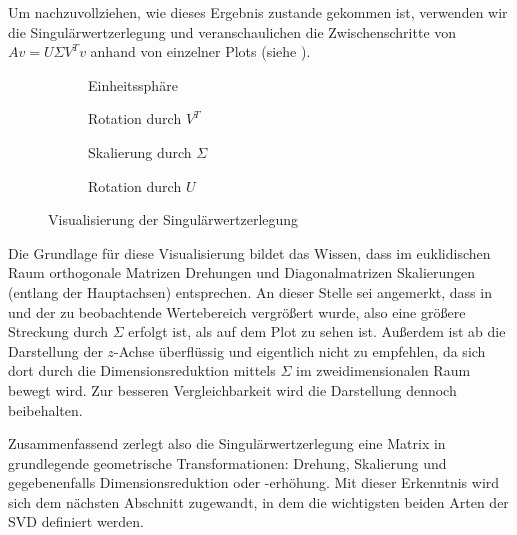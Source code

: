 Um nachzuvollziehen, wie dieses Ergebnis zustande gekommen ist, verwenden wir die Singulärwertzerlegung und veranschaulichen die Zwischenschritte von \(Av = U \Sigma V^{T}v\) anhand von einzelner Plots (siehe ). 
\begin{figure}[t]
    \centering
    \captionsetup[subfigure]{justification=centering}
    \begin{subfigure}{0.45\textwidth}
        \centering
        \caption{Einheitssphäre}\label{fig:svspha}
        
    \end{subfigure}
    \begin{subfigure}{0.45\textwidth}
        \centering
        \caption{Rotation durch \(V^{T}\)}\label{fig:svsphb}
        
    \end{subfigure}
    \begin{subfigure}{0.45\textwidth}
        \centering
        \caption{Skalierung durch \(\Sigma\)}\label{fig:svdsphc}
        
    \end{subfigure}
    \begin{subfigure}{0.45\textwidth}
        \centering
        \caption{Rotation durch \(U\)}\label{fig:svdsphd}
        
    \end{subfigure}
    \caption{Visualisierung der Singulärwertzerlegung}\label{fig:svdsph}
\end{figure}

\enlargethispage{\baselineskip}%
Die Grundlage für diese Visualisierung bildet das Wissen, dass im euklidischen Raum orthogonale Matrizen Drehungen und Diagonalmatrizen Skalierungen (entlang der Hauptachsen) entsprechen.
An dieser Stelle sei angemerkt, dass in  und  der zu beobachtende Wertebereich vergrößert wurde, also eine größere Streckung durch \(\Sigma\) erfolgt ist, als auf dem Plot zu sehen ist.
Außerdem ist ab  die Darstellung der \(z\)-Achse überflüssig und eigentlich nicht zu empfehlen, da sich dort durch die Dimensionsreduktion mittels \(\Sigma\) im zweidimensionalen Raum bewegt wird.
Zur besseren Vergleichbarkeit wird die Darstellung dennoch beibehalten.  

Zusammenfassend zerlegt also die Singulärwertzerlegung eine Matrix in grundlegende geometrische Transformationen: Drehung, Skalierung und gegebenenfalls Dimensionsreduktion oder -erhöhung.
Mit dieser Erkenntnis wird sich dem nächsten Abschnitt zugewandt, in dem die wichtigsten beiden Arten der SVD definiert werden.

